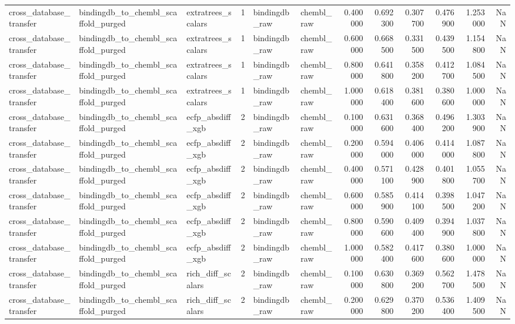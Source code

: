\begin{longtable}{lllrllrrrrrr}
cross\_database\_transfer & bindingdb\_to\_chembl\_scaffold\_purged & extratrees\_scalars & 1 & bindingdb\_raw & chembl\_raw & 0.400000 & 0.692300 & 0.307700 & 0.476900 & 1.253000 & NaN \\
cross\_database\_transfer & bindingdb\_to\_chembl\_scaffold\_purged & extratrees\_scalars & 1 & bindingdb\_raw & chembl\_raw & 0.600000 & 0.668500 & 0.331500 & 0.439500 & 1.154800 & NaN \\
cross\_database\_transfer & bindingdb\_to\_chembl\_scaffold\_purged & extratrees\_scalars & 1 & bindingdb\_raw & chembl\_raw & 0.800000 & 0.641800 & 0.358200 & 0.412700 & 1.084500 & NaN \\
cross\_database\_transfer & bindingdb\_to\_chembl\_scaffold\_purged & extratrees\_scalars & 1 & bindingdb\_raw & chembl\_raw & 1.000000 & 0.618400 & 0.381600 & 0.380600 & 1.000000 & NaN \\
cross\_database\_transfer & bindingdb\_to\_chembl\_scaffold\_purged & ecfp\_absdiff\_xgb & 2 & bindingdb\_raw & chembl\_raw & 0.100000 & 0.631600 & 0.368400 & 0.496200 & 1.303900 & NaN \\
cross\_database\_transfer & bindingdb\_to\_chembl\_scaffold\_purged & ecfp\_absdiff\_xgb & 2 & bindingdb\_raw & chembl\_raw & 0.200000 & 0.594000 & 0.406000 & 0.414000 & 1.087800 & NaN \\
cross\_database\_transfer & bindingdb\_to\_chembl\_scaffold\_purged & ecfp\_absdiff\_xgb & 2 & bindingdb\_raw & chembl\_raw & 0.400000 & 0.571100 & 0.428900 & 0.401800 & 1.055700 & NaN \\
cross\_database\_transfer & bindingdb\_to\_chembl\_scaffold\_purged & ecfp\_absdiff\_xgb & 2 & bindingdb\_raw & chembl\_raw & 0.600000 & 0.585900 & 0.414100 & 0.398500 & 1.047200 & NaN \\
cross\_database\_transfer & bindingdb\_to\_chembl\_scaffold\_purged & ecfp\_absdiff\_xgb & 2 & bindingdb\_raw & chembl\_raw & 0.800000 & 0.590600 & 0.409400 & 0.394900 & 1.037800 & NaN \\
cross\_database\_transfer & bindingdb\_to\_chembl\_scaffold\_purged & ecfp\_absdiff\_xgb & 2 & bindingdb\_raw & chembl\_raw & 1.000000 & 0.582400 & 0.417600 & 0.380600 & 1.000000 & NaN \\
cross\_database\_transfer & bindingdb\_to\_chembl\_scaffold\_purged & rich\_diff\_scalars & 2 & bindingdb\_raw & chembl\_raw & 0.100000 & 0.630800 & 0.369200 & 0.562700 & 1.478500 & NaN \\
cross\_database\_transfer & bindingdb\_to\_chembl\_scaffold\_purged & rich\_diff\_scalars & 2 & bindingdb\_raw & chembl\_raw & 0.200000 & 0.629800 & 0.370200 & 0.536400 & 1.409500 & NaN \\

\end{longtable}
